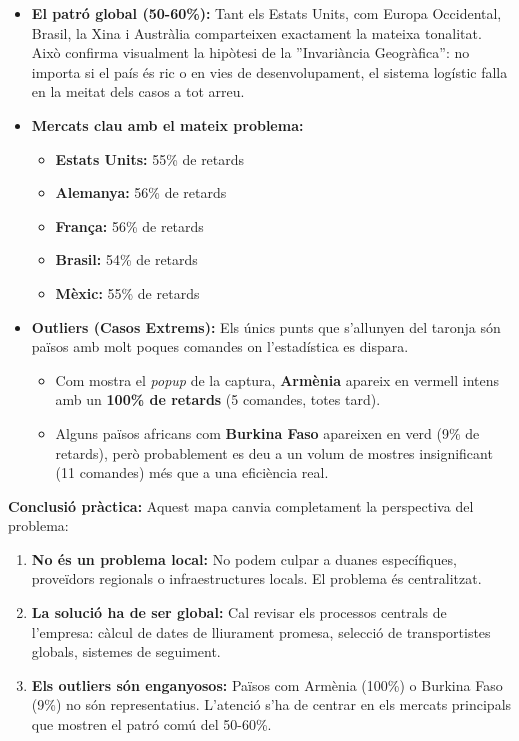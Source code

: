 \documentclass[12pt,a4paper]{article}
\begin{document}
\begin{itemize}
    \item \textbf{El patró global (50-60\%):} Tant els Estats Units, com Europa Occidental, Brasil, la Xina i Austràlia comparteixen exactament la mateixa tonalitat. Això confirma visualment la hipòtesi de la ''Invariància Geogràfica'': no importa si el país és ric o en vies de desenvolupament, el sistema logístic falla en la meitat dels casos a tot arreu.
    
    \item \textbf{Mercats clau amb el mateix problema:}
    \begin{itemize}
        \item \textbf{Estats Units:} 55\% de retards
        \item \textbf{Alemanya:} 56\% de retards  
        \item \textbf{França:} 56\% de retards
        \item \textbf{Brasil:} 54\% de retards
        \item \textbf{Mèxic:} 55\% de retards
    \end{itemize}
    
    \item \textbf{Outliers (Casos Extrems):} Els únics punts que s'allunyen del taronja són països amb molt poques comandes on l'estadística es dispara.
    \begin{itemize}
        \item Com mostra el \textit{popup} de la captura, \textbf{Armènia} apareix en vermell intens amb un \textbf{100\% de retards} (5 comandes, totes tard).
        \item Alguns països africans com \textbf{Burkina Faso} apareixen en verd (9\% de retards), però probablement es deu a un volum de mostres insignificant (11 comandes) més que a una eficiència real.
    \end{itemize}
    
\end{itemize}

\textbf{Conclusió pràctica:} Aquest mapa canvia completament la perspectiva del problema:

\begin{enumerate}
    \item \textbf{No és un problema local:} No podem culpar a duanes específiques, proveïdors regionals o infraestructures locals. El problema és centralitzat.
    
    \item \textbf{La solució ha de ser global:} Cal revisar els processos centrals de l'empresa: càlcul de dates de lliurament promesa, selecció de transportistes globals, sistemes de seguiment.
    
    \item \textbf{Els outliers són enganyosos:} Països com Armènia (100\%) o Burkina Faso (9\%) no són representatius. L'atenció s'ha de centrar en els mercats principals que mostren el patró comú del 50-60\%.
\end{enumerate}
\end{document}
